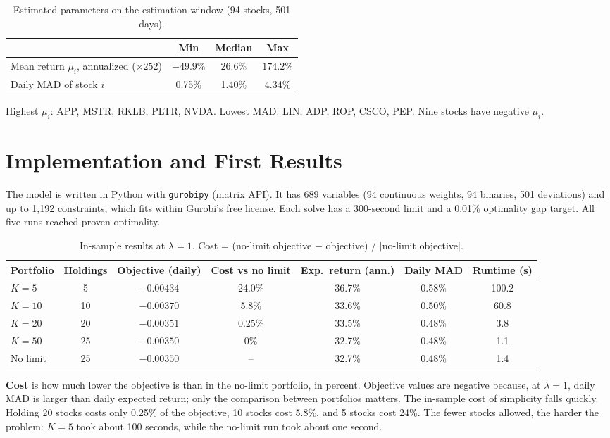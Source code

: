\documentclass[11pt]{article}
\begin{document}
\begin{table}[H]
\centering\small
\caption{Estimated parameters on the estimation window (94 stocks, 501 days).}
\label{tab:params}
\begin{tabular}{lccc}
\toprule
 & Min & Median & Max\\
\midrule
Mean return $\mu_i$, annualized ($\times 252$) & $-49.9\%$ & $26.6\%$ & $174.2\%$\\
Daily MAD of stock $i$ & 0.75\% & 1.40\% & 4.34\%\\
\bottomrule
\end{tabular}

\vspace{2pt}
\footnotesize Highest $\mu_i$: APP, MSTR, RKLB, PLTR, NVDA. Lowest MAD: LIN, ADP, ROP, CSCO, PEP. Nine stocks have negative $\mu_i$.
\end{table}

\section{Implementation and First Results}
The model is written in Python with \texttt{gurobipy} (matrix API). It has 689 variables (94 continuous weights, 94 binaries, 501 deviations) and up to 1,192 constraints, which fits within Gurobi's free license. Each solve has a 300-second limit and a 0.01\% optimality gap target. All five runs reached proven optimality.

\begin{table}[H]
\centering\small
\caption{In-sample results at $\lambda=1$. Cost = (no-limit objective $-$ objective) / $|$no-limit objective$|$.}
\label{tab:insample}
\begin{tabular}{lcccccc}
\toprule
Portfolio & Holdings & Objective (daily) & Cost vs no limit & Exp.\ return (ann.) & Daily MAD & Runtime (s)\\
\midrule
$K=5$ & 5 & $-0.00434$ & 24.0\% & 36.7\% & 0.58\% & 100.2\\
$K=10$ & 10 & $-0.00370$ & 5.8\% & 33.6\% & 0.50\% & 60.8\\
$K=20$ & 20 & $-0.00351$ & 0.25\% & 33.5\% & 0.48\% & 3.8\\
$K=50$ & 25 & $-0.00350$ & 0\% & 32.7\% & 0.48\% & 1.1\\
No limit & 25 & $-0.00350$ & -- & 32.7\% & 0.48\% & 1.4\\
\bottomrule
\end{tabular}
\end{table}

\textbf{Cost} is how much lower the objective is than in the no-limit portfolio, in percent. Objective values are negative because, at $\lambda=1$, daily MAD is larger than daily expected return; only the comparison between portfolios matters. The in-sample cost of simplicity falls quickly. Holding 20 stocks costs only 0.25\% of the objective, 10 stocks cost 5.8\%, and 5 stocks cost 24\%. The fewer stocks allowed, the harder the problem: $K=5$ took about 100 seconds, while the no-limit run took about one second.
\end{document}
